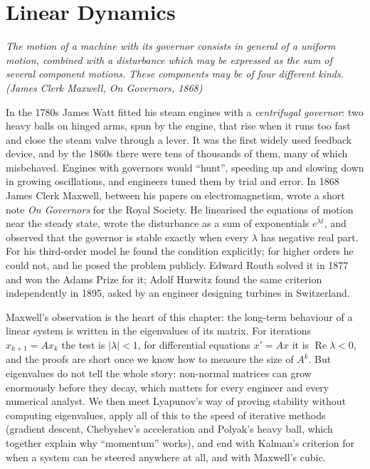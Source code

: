 \chapter{Linear Dynamics}\label{linear:ch:dynamics}

\begin{center}\itshape
The motion of a machine with its governor consists in general of a uniform motion, combined with a disturbance which may be
expressed as the sum of several component motions. These components may be of four different kinds.
\upshape(James Clerk Maxwell, \emph{On Governors}, 1868)
\end{center}

In the 1780s James Watt fitted his steam engines with a \emph{centrifugal governor}: two heavy balls on hinged arms, spun by the
engine, that rise when it runs too fast and close the steam valve through a lever. It was the first widely used feedback device,
and by the 1860s there were tens of thousands of them, many of which misbehaved. Engines with governors would ``hunt'', speeding up
and slowing down in growing oscillations, and engineers tuned them by trial and error. In 1868 James Clerk Maxwell, between his
papers on electromagnetism, wrote a short note \emph{On Governors} for the Royal Society. He linearised the equations of motion
near the steady state, wrote the disturbance as a sum of exponentials $e^{\lambda t}$, and observed that the governor is stable
exactly when every $\lambda$ has negative real part. For his third-order model he found the condition explicitly; for higher
orders he could not, and he posed the problem publicly. Edward Routh solved it in 1877 and won the Adams Prize for it; Adolf
Hurwitz found the same criterion independently in 1895, asked by an engineer designing turbines in Switzerland.

Maxwell's observation is the heart of this chapter: the long-term behaviour of a linear system is written in the eigenvalues of its
matrix. For iterations $x_{k+1}=Ax_k$ the test is $|\lambda|<1$, for differential equations $x'=Ax$ it is $\operatorname{Re}\lambda<0$,
and the proofs are short once we know how to measure the size of $A^k$. But eigenvalues do not tell the whole story: non-normal
matrices can grow enormously before they decay, which matters for every engineer and every numerical analyst. We then meet
Lyapunov's way of proving stability without computing eigenvalues, apply all of this to the speed of iterative methods (gradient
descent, Chebyshev's acceleration and Polyak's heavy ball, which together explain why ``momentum'' works), and end with Kalman's
criterion for when a system can be steered anywhere at all, and with Maxwell's cubic.

